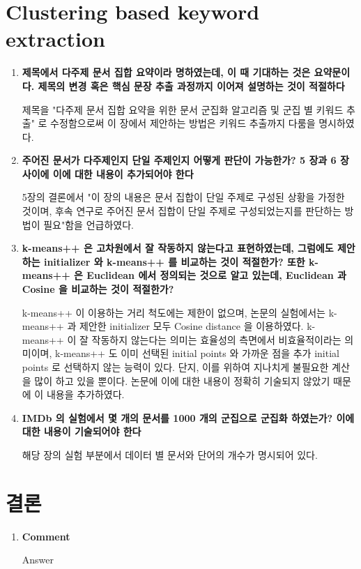 \documentclass[11pt]{article}
\begin{document}
\section{Clustering based keyword extraction}
\begin{enumerate}
\item \textbf{제목에서 다주제 문서 집합 요약이라 명하였는데, 이 때 기대하는 것은 요약문이다. 제목의 변경 혹은 핵심 문장 추출 과정까지 이어져 설명하는 것이 적절하다}

제목을 "다주제 문서 집합 요약을 위한 문서 군집화 알고리즘 및 군집 별 키워드 추출" 로 수정함으로써 이 장에서 제안하는 방법은 키워드 추출까지 다룸을 명시하였다.

\item \textbf{주어진 문서가 다주제인지 단일 주제인지 어떻게 판단이 가능한가? 5 장과 6 장 사이에 이에 대한 내용이 추가되어야 한다}

5장의 결론에서 "이 장의 내용은 문서 집합이 단일 주제로 구성된 상황을 가정한 것이며, 후속 연구로 주어진 문서 집합이 단일 주제로 구성되었는지를 판단하는 방법이 필요"함을 언급하였다.

\item \textbf{k-means++ 은 고차원에서 잘 작동하지 않는다고 표현하였는데, 그럼에도 제안하는 initializer 와 k-means++ 를 비교하는 것이 적절한가? 또한 k-means++ 은 Euclidean 에서 정의되는 것으로 알고 있는데, Euclidean 과 Cosine 을 비교하는 것이 적절한가?}

k-means++ 이 이용하는 거리 척도에는 제한이 없으며, 논문의 실험에서는 k-means++ 과 제안한 initializer  모두 Cosine distance 을 이용하였다.
k-means++ 이 잘 작동하지 않는다는 의미는 효율성의 측면에서 비효율적이라는 의미이며, k-means++ 도 이미 선택된 initial points 와 가까운 점을 추가 initial points 로 선택하지 않는 능력이 있다.
단지, 이를 위하여 지나치게 불필요한 계산을 많이 하고 있을 뿐이다.
논문에 이에 대한 내용이 정확히 기술되지 않았기 때문에 이 내용을 추가하였다.

\item \textbf{IMDb 의 실험에서 몇 개의 문서를 1000 개의 군집으로 군집화 하였는가? 이에 대한 내용이 기술되어야 한다}

해당 장의 실험 부분에서 데이터 별 문서와 단어의 개수가 명시되어 있다.

\end{enumerate}


\section{결론}
\begin{enumerate}
\item \textbf{Comment}

Answer

\end{enumerate}
\end{document}
